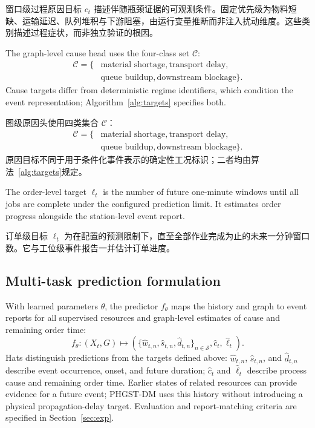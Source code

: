 \documentclass[a4paper,fleqn]{cas-dc}
\newcommand{\zhpara}[1]{%
  \par\begingroup\small\color{black!72}\noindent #1\par\endgroup}
\begin{document}
\zhpara{窗口级过程原因目标 $c_t$ 描述伴随瓶颈证据的可观测条件。固定优先级为物料短缺、运输延迟、队列堆积与下游阻塞，由运行变量推断而非注入扰动维度。这些类别描述过程症状，而非独立验证的根因。}


The graph-level cause head uses the four-class set $\mathcal{C}$:
\begin{equation}
\begin{aligned}
\mathcal{C}=\{&
\text{material shortage},\text{transport delay},\\
&\text{queue buildup},\text{downstream blockage}\}.
\end{aligned}
\end{equation}
Cause targets differ from deterministic regime identifiers, which condition the event representation; Algorithm~\ref{alg:targets} specifies both.

\zhpara{图级原因头使用四类集合 $\mathcal{C}$：
\begin{equation}
\begin{aligned}
\mathcal{C}=\{&
\text{material shortage},\text{transport delay},\\
&\text{queue buildup},\text{downstream blockage}\}.
\end{aligned}
\end{equation}
原因目标不同于用于条件化事件表示的确定性工况标识；二者均由算法~\ref{alg:targets}规定。}


The order-level target $\ell_t$ is the number of future one-minute windows until all jobs are complete under the configured prediction limit. It estimates order progress alongside the station-level event report.

\zhpara{订单级目标 $\ell_t$ 为在配置的预测限制下，直至全部作业完成为止的未来一分钟窗口数。它与工位级事件报告一并估计订单进度。}


\subsection{Multi-task prediction formulation}

With learned parameters $\theta$, the predictor $f_{\theta}$ maps the history and graph to event reports for all supervised resources and graph-level estimates of cause and remaining order time:
\begin{equation}
f_{\theta}:(X_t,G)\longmapsto
\left(
\{\hat w_{t,n},\hat s_{t,n},\hat d_{t,n}\}_{n\in\mathcal{S}},
\hat c_t,\hat\ell_t
\right).
\end{equation}
Hats distinguish predictions from the targets defined above: $\hat w_{t,n}$, $\hat s_{t,n}$, and $\hat d_{t,n}$ describe event occurrence, onset, and future duration; $\hat c_t$ and $\hat\ell_t$ describe process cause and remaining order time. Earlier states of related resources can provide evidence for a future event; PHGST-DM uses this history without introducing a physical propagation-delay target. Evaluation and report-matching criteria are specified in Section~\ref{sec:exp}.
\end{document}
